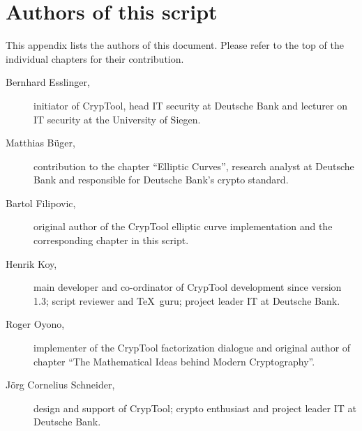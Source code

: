 \section{Authors of this script}
This appendix lists the authors of this document. Please refer to the top of the individual
chapters for their contribution.

\begin{description}
\item[Bernhard Esslinger,] initiator of CrypTool, head IT security at Deutsche
Bank and lecturer on IT security at the University of Siegen.
 
\item[Matthias B\"uger,] contribution to the chapter ``Elliptic Curves'',
research analyst at Deutsche Bank and responsible for Deutsche Bank's
crypto standard.

\item[Bartol Filipovic,] original author of the CrypTool elliptic curve
implementation and the corresponding chapter in this script.

\item[Henrik Koy, ] main developer and co-ordinator of CrypTool development
since version 1.3; script reviewer and \TeX\ guru; project leader IT at
Deutsche Bank.

\item[Roger Oyono, ] implementer of the CrypTool factorization dialogue and
original author of chapter ``The Mathematical Ideas behind Modern
Cryptography''.

\item[J\"org Cornelius Schneider,] design and support of CrypTool; crypto
enthusiast and project leader IT at Deutsche Bank.

\end{description}

